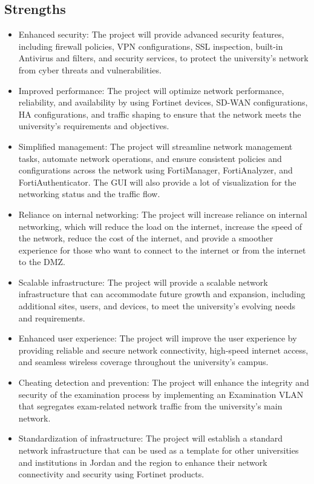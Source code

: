 \documentclass[12pt]{report}
\begin{document}
\subsection{Strengths}
\begin{itemize}
    \item Enhanced security: The project will provide advanced security features, including firewall policies, VPN configurations, SSL inspection, built-in Antivirus and filters, and security services, to protect the university's network from cyber threats and vulnerabilities.
    \item Improved performance: The project will optimize network performance, reliability, and availability by using Fortinet devices, SD-WAN configurations, HA configurations, and traffic shaping to ensure that the network meets the university's requirements and objectives.
    \item Simplified management: The project will streamline network management tasks, automate network operations, and ensure consistent policies and configurations across the network using FortiManager, FortiAnalyzer, and FortiAuthenticator. The GUI will also provide a lot of visualization for the networking status and the traffic flow.
    \item Reliance on internal networking: The project will increase reliance on internal networking, which will reduce the load on the internet, increase the speed of the network, reduce the cost of the internet, and provide a smoother experience for those who want to connect to the internet or from the internet to the DMZ.
    \item Scalable infrastructure: The project will provide a scalable network infrastructure that can accommodate future growth and expansion, including additional sites, users, and devices, to meet the university's evolving needs and requirements.
    \item Enhanced user experience: The project will improve the user experience by providing reliable and secure network connectivity, high-speed internet access, and seamless wireless coverage throughout the university's campus.
    \item Cheating detection and prevention: The project will enhance the integrity and security of the examination process by implementing an Examination VLAN that segregates exam-related network traffic from the university's main network.
    \item Standardization of infrastructure: The project will establish a standard network infrastructure that can be used as a template for other universities and institutions in Jordan and the region to enhance their network connectivity and security using Fortinet products.
\end{itemize}
\end{document}
